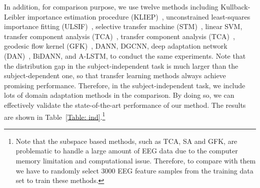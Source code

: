 \documentclass[journal]{IEEEtran}
\begin{document}
In addition, for comparison purpose, we use twelve methods including Kullback-Leibler importance estimation procedure (KLIEP)~\cite{sugiyama2008direct}, unconstrained least-squares importance fitting (ULSIF)~\cite{kanamori2009least}, selective transfer machine (STM)~\cite{chu2017selective}, linear SVM, transfer component analysis (TCA)~\cite{pan2011domain}, transfer component analysis (TCA)~\cite{fernando2013unsupervised}, geodesic flow kernel (GFK)~\cite{gong2012geodesic}, DANN, DGCNN, deep adaptation network (DAN)~\cite{li2018cross}, BiDANN, and A-LSTM, to conduct the same experiments. Note that the distribution gap in the subject-independent task is much larger than the subject-dependent one, so that transfer learning methods always achieve promising performance. Therefore, in the subject-independent task, we include lots of domain adaptation methods in the comparison. By doing so, we can effectively validate the state-of-the-art performance of our method. The results are shown in Table~\ref{Table: ind}.\footnote{Note that the subspace based methods, such as TCA, SA and GFK, are problematic to handle a large amount of EEG data due to the computer memory limitation and computational issue. Therefore, to compare with them we have to randomly select 3000 EEG feature samples from the training data set to train these methods.} 
\end{document}

